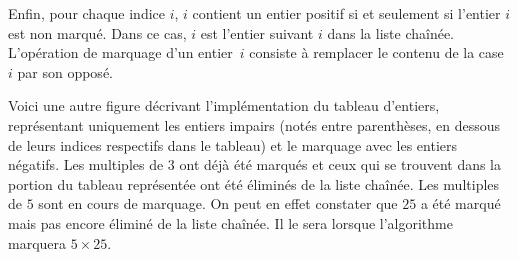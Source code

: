 \documentclass[a4paper]{easychair}
\newcommand\arri[1]{\ocamlf{suiv[}#1\ocamlf{]}}
\begin{document}
Enfin, pour chaque indice $i$, \arri{$i$} contient un entier positif
si et seulement si l'entier $i$ est non marqué.
Dans ce cas, \arri{$i$} est l'entier suivant $i$ dans la liste chaînée.
L'opération de marquage d'un entier~$i$ consiste à remplacer le
contenu de la case~$i$ par son opposé.

Voici une autre figure décrivant l'implémentation du tableau d'entiers,
représentant uniquement les entiers impairs (notés entre parenthèses, en
dessous de leurs indices respectifs dans le tableau) et le marquage avec
les entiers négatifs. Les multiples de $3$ ont
déjà été marqués et ceux qui se trouvent dans la portion du tableau
représentée
ont été éliminés de la liste chaînée.
Les multiples de $5$ sont en cours de marquage.
On peut en effet constater que $25$ a été marqué mais pas encore éliminé de
la liste chaînée. Il le sera lorsque l'algorithme marquera $5 \times 25$.
\end{document}
